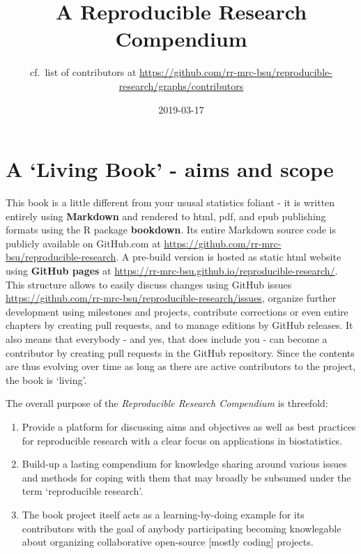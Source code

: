 \documentclass[]{book}
\title{A Reproducible Research Compendium}
\author{cf.~list of contributors at
\url{https://github.com/rr-mrc-bsu/reproducible-research/graphs/contributors}}
\date{2019-03-17}
\providecommand{\tightlist}{%
  \setlength{\itemsep}{0pt}\setlength{\parskip}{0pt}}
\begin{document}
\maketitle

{
\setcounter{tocdepth}{1}
\tableofcontents
}
\chapter{\texorpdfstring{A `Living Book' - aims and
scope}{A Living Book - aims and scope}}\label{a-living-book---aims-and-scope}

This book is a little different from your ususal statistics foliant - it
is written entirely using \textbf{Markdown} and rendered to html, pdf,
and epub publishing formats using the R package \textbf{bookdown}. Its
entire Markdown source code is publicly available on GitHub.com at
\url{https://github.com/rr-mrc-bsu/reproducible-research}. A pre-build
version is hosted as static html website using \textbf{GitHub pages} at
\url{https://rr-mrc-bsu.github.io/reproducible-research/}. This
structure allows to easily discuss changes using GitHub issues
\url{https://github.com/rr-mrc-bsu/reproducible-research/issues},
organize further development using milestones and projects, contribute
corrections or even entire chapters by creating pull requests, and to
manage editions by GitHub releases. It also means that everybody - and
yes, that does include you - can become a contributor by creating pull
requests in the GitHub repository. Since the contents are thus evolving
over time as long as there are active contributors to the project, the
book is `living'.

The overall purpose of the \emph{Reproducible Research Compendium} is
threefold:

\begin{enumerate}
\def\labelenumi{\arabic{enumi}.}
\tightlist
\item
  Provide a platform for discussing aims and objectives as well as best
  practices for reproducible research with a clear focus on applications
  in biostatistics.
\item
  Build-up a lasting compendium for knowledge sharing around various
  issues and methods for coping with them that may broadly be subsumed
  under the term `reproducible research'.
\item
  The book project itself acts as a learning-by-doing example for its
  contributors with the goal of anybody participating becoming
  knowlegable about organizing collaborative open-source {[}mostly
  coding{]} projects.
\end{enumerate}
\end{document}
